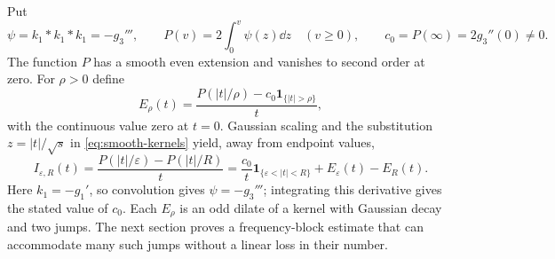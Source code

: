 Put
\[
 \psi=k_1*k_1*k_1=-g_3''',\qquad
 P(v)=2\int_0^v\psi(z)\dd z\quad(v\ge0),\qquad
 c_0=P(\infty)=2g_3''(0)\ne0.
\]
The function $P$ has a smooth even extension and vanishes to second
order at zero. For $\rho>0$ define
\begin{equation}\label{eq:endpoint-kernel}
 E_\rho(t)=\frac{P(|t|/\rho)-c_0\mathbf1_{\{|t|>\rho\}}}{t},
\end{equation}
with the continuous value zero at $t=0$.
Gaussian scaling and the substitution $z=|t|/\sqrt s$ in
\eqref{eq:smooth-kernels} yield, away from endpoint values,
\begin{equation}\label{eq:hard-smooth}
 I_{\varepsilon,R}(t)
 =\frac{P(|t|/\varepsilon)-P(|t|/R)}{t}
 =\frac{c_0}{t}\mathbf1_{\{\varepsilon<|t|<R\}}
       +E_\varepsilon(t)-E_R(t).
\end{equation}
Here $k_1=-g_1'$, so convolution gives $\psi=-g_3'''$; integrating
this derivative gives the stated value of $c_0$.
Each $E_\rho$ is an odd dilate of a kernel with Gaussian decay and
two jumps. The next section proves a frequency-block estimate that
can accommodate many such jumps without a linear loss in their number.
